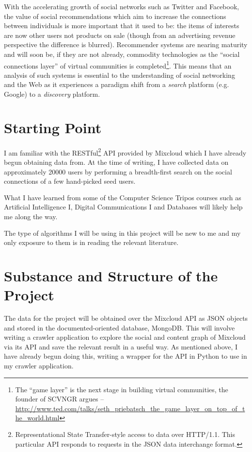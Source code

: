 With the accelerating growth of social networks such as Twitter and Facebook, the value of social recommendations which aim to increase the connections between individuals is more important that it used to be: the items of interests are now other users not products on sale (though from an advertising revenue perspective the difference is blurred). Recommender systems are nearing maturity and will soon be, if they are not already, commodity technologies as the ``social connections layer'' of virtual communities is completed\footnote{The ``game layer'' is the next stage in building virtual communities, the founder of SCVNGR argues -- \url{http://www.ted.com/talks/seth_priebatsch_the_game_layer_on_top_of_the_world.html}}. This means that an analysis of such systems is essential to the understanding of social networking and the Web as it experiences a paradigm shift from a \emph{search} platform (e.g. Google) to a \emph{discovery} platform.

\section{Starting Point}

I am familiar with the RESTful\footnote{Representational State Transfer-style access to data over HTTP/1.1. This particular API responds to requests in the JSON data interchange format.} API provided by Mixcloud which I have already begun obtaining data from. At the time of writing, I have collected data on approximately 20000 users by performing a breadth-first search on the social connections of a few hand-picked seed users. 

What I have learned from some of the Computer Science Tripos courses such as Artificial Intelligence I, Digital Communications I and Databases will likely help me along the way.

The type of algorithms I will be using in this project will be new to me and my only exposure to them is in reading the relevant literature.
  
\section{Substance and Structure of the Project}

The data for the project will be obtained over the Mixcloud API as JSON objects and stored in the documented-oriented database, MongoDB. This will involve writing a crawler application to explore the social and content graph of Mixcloud via its API and save the relevant result in a useful way. As mentioned above, I have already begun doing this, writing a wrapper for the API in Python to use in my crawler application.

